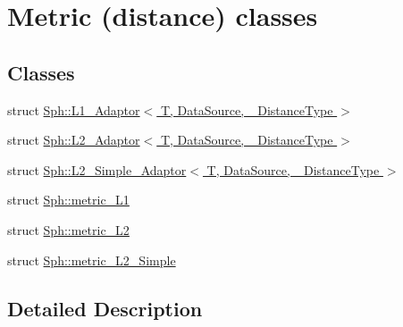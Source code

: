 \hypertarget{group__metric__grp}{}\section{Metric (distance) classes}
\label{group__metric__grp}
\subsection*{Classes}
\begin{DoxyCompactItemize}
\item 
struct \hyperlink{structSph_1_1L1__Adaptor}{Sph\+::\+L1\+\_\+\+Adaptor$<$ T, Data\+Source, \+\_\+\+Distance\+Type $>$}
\item 
struct \hyperlink{structSph_1_1L2__Adaptor}{Sph\+::\+L2\+\_\+\+Adaptor$<$ T, Data\+Source, \+\_\+\+Distance\+Type $>$}
\item 
struct \hyperlink{structSph_1_1L2__Simple__Adaptor}{Sph\+::\+L2\+\_\+\+Simple\+\_\+\+Adaptor$<$ T, Data\+Source, \+\_\+\+Distance\+Type $>$}
\item 
struct \hyperlink{structSph_1_1metric__L1}{Sph\+::metric\+\_\+\+L1}
\item 
struct \hyperlink{structSph_1_1metric__L2}{Sph\+::metric\+\_\+\+L2}
\item 
struct \hyperlink{structSph_1_1metric__L2__Simple}{Sph\+::metric\+\_\+\+L2\+\_\+\+Simple}
\end{DoxyCompactItemize}


\subsection{Detailed Description}
